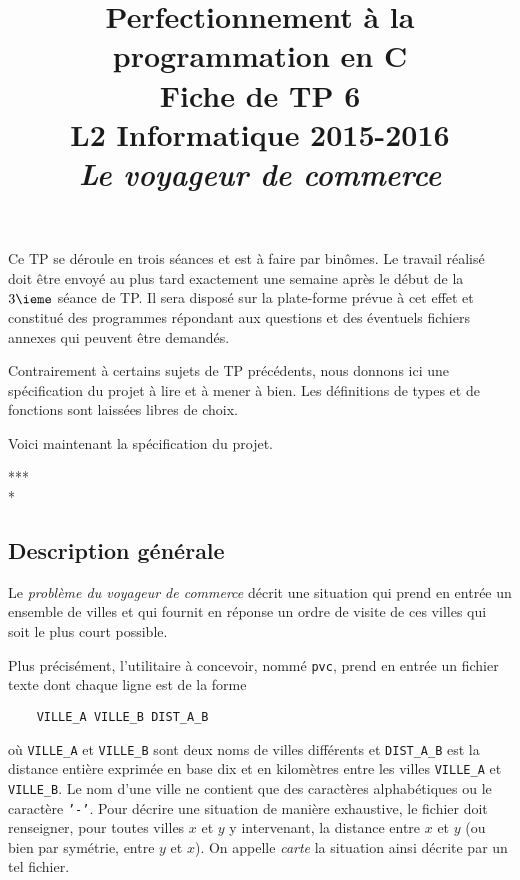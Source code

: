 \documentclass[12pt]{article}
\date{}
\title{{\bf Perfectionnement à la programmation en {\sf C}} \\
    Fiche de TP 6 \\
    {\small L2 Informatique 2015-2016} \\
    {\it \small Le voyageur de commerce}}
\theoremstyle{definition}
\begin{document}
\maketitle

Ce TP se déroule en trois séances et est à faire par binômes. Le travail
réalisé doit être envoyé au plus tard exactement une semaine après le
début de la $3\ieme$ séance de TP. Il sera disposé sur la plate-forme
prévue à cet effet et constitué des programmes répondant aux questions
et des éventuels fichiers annexes qui peuvent être demandés.
\bigskip
\bigskip

Contrairement à certains sujets de TP précédents, nous donnons ici une
spécification du projet à lire et à mener à bien. Les définitions de
types et de fonctions sont laissées libres de choix.
\bigskip

Voici maintenant la spécification du projet.
\bigskip

\begin{center} *** \\ * \end{center}

\subsection*{\centering  Description générale}
Le {\em problème du voyageur de commerce} décrit une situation qui prend
en entrée un ensemble de villes et qui fournit en réponse un ordre de
visite de ces villes qui soit le plus court possible.
\medskip

Plus précisément, l'utilitaire à concevoir, nommé {\tt pvc}, prend en
entrée un fichier texte dont chaque ligne est de la forme
\begin{verbatim}
    VILLE_A VILLE_B DIST_A_B
\end{verbatim}
où {\tt VILLE\_A} et {\tt VILLE\_B} sont deux noms de villes différents
et {\tt DIST\_A\_B} est la distance entière exprimée en base dix et en
kilomètres entre les villes {\tt VILLE\_A} et {\tt VILLE\_B}. Le nom
d'une ville ne contient que des caractères alphabétiques ou le caractère
{\tt '-'}. Pour décrire une situation de manière exhaustive, le fichier
doit renseigner, pour toutes villes $x$ et $y$ y intervenant, la distance
entre $x$ et $y$ (ou bien par symétrie, entre $y$ et $x$). On appelle
{\em carte} la situation ainsi décrite par un tel fichier.
\medskip
\end{document}
